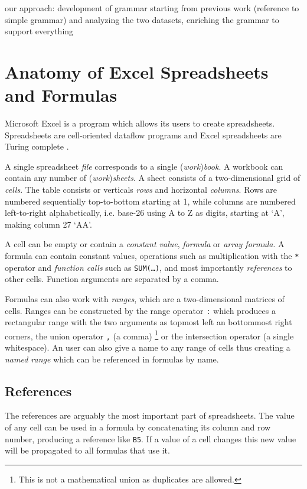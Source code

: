 \documentclass[conference]{IEEEtran}
\begin{document}
our approach:
development of grammar starting from previous work (reference to simple grammar) and analyzing the two datasets, enriching the
grammar to support everything

\section{Anatomy of Excel Spreadsheets and Formulas}

Microsoft Excel is a program which allows its users to create spreadsheets.
Spreadsheets are cell-oriented dataflow programs and Excel spreadsheets are Turing complete \cite{ExcelTuringComplete}.

A single spreadsheet \emph{file} corresponds to a single (\emph{work})\emph{book}.
A workbook can contain any number of (\emph{work})\emph{sheets}.
A sheet consists of a two-dimensional grid of \emph{cells}.
The table consists or verticals \emph{rows} and horizontal \emph{columns}.
Rows are numbered sequentially top-to-bottom starting at 1, while columns are numbered left-to-right alphabetically, i.e. base-26 using A to Z as digits, starting at `A', making column 27 `AA'.

A cell can be empty or contain a \emph{constant value}, \emph{formula} or \emph{array formula}.
A formula can contain constant values, operations such as multiplication with the \texttt{*} operator and \emph{function calls} such as \texttt{SUM(\ldots)}, and most importantly \emph{references} to other cells.
Function arguments are separated by a comma.

Formulas can also work with \emph{ranges}, which are a two-dimensional matrices of cells.
Ranges can be constructed by the range operator \texttt{:} which produces a rectangular range with the two arguments as topmost left an bottommost right corners, the union operator \texttt{,} (a comma) \footnote{This is not a mathematical union as duplicates are allowed.} or the intersection operator \texttt{} (a single whitespace). 
An user can also give a name to any range of cells thus creating a \emph{named range} which can be referenced in formulas by name.

\subsection{References}
The references are arguably the most important part of spreadsheets.
The value of any cell can be used in a formula by concatenating its column and row number, producing a reference like \texttt{B5}.
If a value of a cell changes this new value will be propagated to all formulas that use it.
\end{document}
